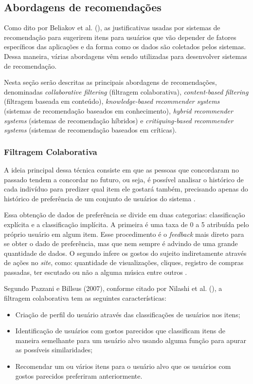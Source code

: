 \subsection{Abordagens de recomendações}

Como dito por Beliakov et al. (\citeyear{Beliakov:2011}), as justificativas usadas por sistemas de recomendação para sugerirem itens para usuários que vão depender de fatores específicos das aplicações e da forma como os dados são coletados pelos sistemas. Dessa maneira, várias abordagens vêm sendo utilizadas para desenvolver sistemas de recomendação.

Nesta seção serão descritas as principais abordagens de recomendações, denominadas \textit{collaborative filtering} (filtragem colaborativa), \textit{content-based filtering} (filtragem baseada em conteúdo), \textit{knowledge-based recommender systems} (sistemas de recomendação baseados em conhecimento), \textit{hybrid recommender systems} (sistemas de recomendação híbridos) e \textit{critiquing-based recommender systems} (sistemas de recomendação baseados em críticas).

\subsubsection{Filtragem Colaborativa} 
\label{Collaborativefiltering}
A ideia principal dessa técnica consiste em que as pessoas que concordaram no passado tendem a concordar no futuro, ou seja, é possível analisar o histórico de cada indivíduo para predizer qual item ele gostará também, precisando apenas do histórico de preferência de um conjunto de usuários do sistema \cite{Nilashi:2013}.

Essa obtenção de dados de preferência se divide em duas categorias: classificação explícita e a classificação implícita. A primeira é uma taxa de 0 a 5 atribuída pelo próprio usuário em algum item. Esse procedimento é o \textit{feedback} mais direto para se obter o dado de preferência, mas que nem sempre é advindo de uma grande quantidade de dados. O segundo infere os gostos do sujeito indiretamente através de ações no \textit{site}, como: quantidade de visualizações, cliques, registro de compras passadas, ter escutado ou não a alguma música entre outros \cite{luo:2018}.
	
Segundo Pazzani e Billsus (2007), conforme citado por Nilashi et al. (\citeyear{Nilashi:2013}), a filtragem colaborativa tem as seguintes características:

\begin{itemize}
    \item Criação de perfil do usuário através das classificações de usuários nos itens;
    \item Identificação de usuários com gostos parecidos que classificam itens de maneira semelhante para um usuário alvo usando alguma função para apurar as possíveis similaridades;
    \item Recomendar um ou vários itens para o usuário alvo que os usuários com gostos parecidos preferiram anteriormente.

\end{itemize}

